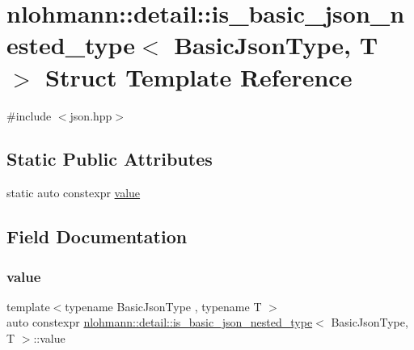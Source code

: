 \hypertarget{structnlohmann_1_1detail_1_1is__basic__json__nested__type}{}\section{nlohmann\+::detail\+::is\+\_\+basic\+\_\+json\+\_\+nested\+\_\+type$<$ Basic\+Json\+Type, T $>$ Struct Template Reference}
\label{structnlohmann_1_1detail_1_1is__basic__json__nested__type}


{\ttfamily \#include $<$json.\+hpp$>$}

\subsection*{Static Public Attributes}
\begin{DoxyCompactItemize}
\item 
static auto constexpr \mbox{\hyperlink{structnlohmann_1_1detail_1_1is__basic__json__nested__type_aee5fee744e5298a78d557f2ee5f090db}{value}}
\end{DoxyCompactItemize}


\subsection{Field Documentation}
\mbox{\label{structnlohmann_1_1detail_1_1is__basic__json__nested__type_aee5fee744e5298a78d557f2ee5f090db}} 
\subsubsection{\texorpdfstring{value}{value}}
{\footnotesize\ttfamily template$<$typename Basic\+Json\+Type , typename T $>$ \\
auto constexpr \mbox{\hyperlink{structnlohmann_1_1detail_1_1is__basic__json__nested__type}{nlohmann\+::detail\+::is\+\_\+basic\+\_\+json\+\_\+nested\+\_\+type}}$<$ Basic\+Json\+Type, T $>$\+::value\hspace{0.3cm}{\ttfamily [static]}}

